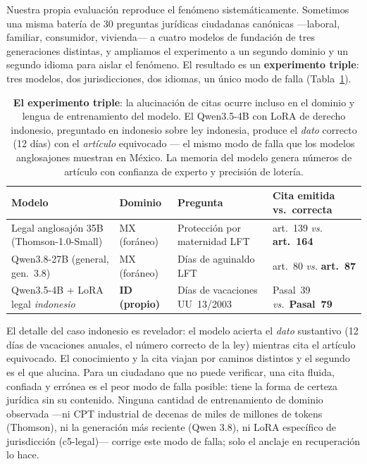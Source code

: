 Nuestra propia evaluación reproduce el fenómeno sistemáticamente. Sometimos una misma batería de 30 preguntas jurídicas ciudadanas canónicas ---laboral, familiar, consumidor, vivienda--- a cuatro modelos de fundación de tres generaciones distintas, y ampliamos el experimento a un segundo dominio y un segundo idioma para aislar el fenómeno. El resultado es un \textbf{experimento triple}: tres modelos, dos jurisdicciones, dos idiomas, un único modo de falla (Tabla~\ref{tab:triple}).

\begin{table}[H]
\centering
\small
\begin{tabular}{@{}p{3.4cm}p{2.2cm}p{3.2cm}p{3.6cm}@{}}
\toprule
\textbf{Modelo} & \textbf{Dominio} & \textbf{Pregunta} & \textbf{Cita emitida vs.\ correcta} \\
\midrule
Legal anglosajón 35B (Thomson-1.0-Small) & MX (foráneo) & Protección por maternidad LFT & art.~139 \emph{vs.} \textbf{art.~164} \\
Qwen3.8-27B (general, gen.\ 3.8) & MX (foráneo) & Días de aguinaldo LFT & art.~80 \emph{vs.} \textbf{art.~87} \\
Qwen3.5-4B + LoRA legal \emph{indonesio} & \textbf{ID (propio)} & Días de vacaciones UU~13/2003 & Pasal~39 \emph{vs.}\ \textbf{Pasal~79} \\
\bottomrule
\end{tabular}
\caption{\textbf{El experimento triple}: la alucinación de citas ocurre incluso en el dominio y lengua de entrenamiento del modelo. El Qwen3.5-4B con LoRA de derecho indonesio, preguntado en indonesio sobre ley indonesia, produce el \emph{dato} correcto (12 días) con el \emph{artículo} equivocado --- el mismo modo de falla que los modelos anglosajones muestran en México. La memoria del modelo genera números de artículo con confianza de experto y precisión de lotería.}
\label{tab:triple}
\end{table}

El detalle del caso indonesio es revelador: el modelo acierta el \emph{dato} sustantivo (12 días de vacaciones anuales, el número correcto de la ley) mientras cita el artículo equivocado. El conocimiento y la cita viajan por caminos distintos y el segundo es el que alucina. Para un ciudadano que no puede verificar, una cita fluida, confiada y errónea es el peor modo de falla posible: tiene la forma de certeza jurídica sin su contenido. Ninguna cantidad de entrenamiento de dominio observada ---ni CPT industrial de decenas de miles de millones de tokens (Thomson), ni la generación más reciente (Qwen 3.8), ni LoRA específico de jurisdicción (c5-legal)--- corrige este modo de falla; solo el anclaje en recuperación lo hace.


